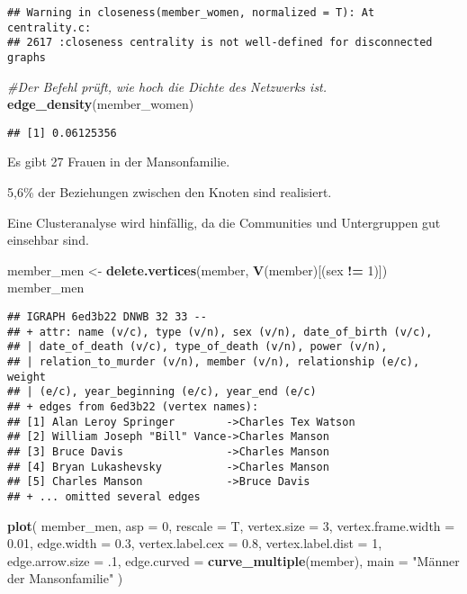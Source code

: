 \documentclass[
]{article}
\newenvironment{Shaded}{\begin{snugshade}}{\end{snugshade}}
\newcommand{\CommentTok}[1]{\textcolor[rgb]{0.56,0.35,0.01}{\textit{#1}}}
\newcommand{\DataTypeTok}[1]{\textcolor[rgb]{0.13,0.29,0.53}{#1}}
\newcommand{\DecValTok}[1]{\textcolor[rgb]{0.00,0.00,0.81}{#1}}
\newcommand{\FloatTok}[1]{\textcolor[rgb]{0.00,0.00,0.81}{#1}}
\newcommand{\KeywordTok}[1]{\textcolor[rgb]{0.13,0.29,0.53}{\textbf{#1}}}
\newcommand{\NormalTok}[1]{#1}
\newcommand{\OperatorTok}[1]{\textcolor[rgb]{0.81,0.36,0.00}{\textbf{#1}}}
\newcommand{\StringTok}[1]{\textcolor[rgb]{0.31,0.60,0.02}{#1}}
\begin{document}
\begin{verbatim}
## Warning in closeness(member_women, normalized = T): At centrality.c:
## 2617 :closeness centrality is not well-defined for disconnected graphs
\end{verbatim}

\begin{Shaded}
\begin{Highlighting}[]
\CommentTok{#Der Befehl prüft, wie hoch die Dichte des Netzwerks ist.}
\KeywordTok{edge_density}\NormalTok{(member_women)}
\end{Highlighting}
\end{Shaded}

\begin{verbatim}
## [1] 0.06125356
\end{verbatim}

Es gibt 27 Frauen in der Mansonfamilie.

5,6\% der Beziehungen zwischen den Knoten sind realisiert.

Eine Clusteranalyse wird hinfällig, da die Communities und Untergruppen
gut einsehbar sind.

\begin{Shaded}
\begin{Highlighting}[]
\NormalTok{member_men <-}\StringTok{ }\KeywordTok{delete.vertices}\NormalTok{(member, }\KeywordTok{V}\NormalTok{(member)[(sex }\OperatorTok{!=}\StringTok{ }\DecValTok{1}\NormalTok{)])}
\NormalTok{member_men}
\end{Highlighting}
\end{Shaded}

\begin{verbatim}
## IGRAPH 6ed3b22 DNWB 32 33 -- 
## + attr: name (v/c), type (v/n), sex (v/n), date_of_birth (v/c),
## | date_of_death (v/c), type_of_death (v/n), power (v/n),
## | relation_to_murder (v/n), member (v/n), relationship (e/c), weight
## | (e/c), year_beginning (e/c), year_end (e/c)
## + edges from 6ed3b22 (vertex names):
## [1] Alan Leroy Springer        ->Charles Tex Watson
## [2] William Joseph "Bill" Vance->Charles Manson    
## [3] Bruce Davis                ->Charles Manson    
## [4] Bryan Lukashevsky          ->Charles Manson    
## [5] Charles Manson             ->Bruce Davis       
## + ... omitted several edges
\end{verbatim}

\begin{Shaded}
\begin{Highlighting}[]
\KeywordTok{plot}\NormalTok{(}
\NormalTok{  member_men,}
  \DataTypeTok{asp =} \DecValTok{0}\NormalTok{,}
  \DataTypeTok{rescale =}\NormalTok{ T,}
  \DataTypeTok{vertex.size =} \DecValTok{3}\NormalTok{,}
  \DataTypeTok{vertex.frame.width =} \FloatTok{0.01}\NormalTok{,}
  \DataTypeTok{edge.width =} \FloatTok{0.3}\NormalTok{,}
  \DataTypeTok{vertex.label.cex =} \FloatTok{0.8}\NormalTok{,}
  \DataTypeTok{vertex.label.dist =} \DecValTok{1}\NormalTok{,}
  \DataTypeTok{edge.arrow.size =} \FloatTok{.1}\NormalTok{,}
  \DataTypeTok{edge.curved =} \KeywordTok{curve_multiple}\NormalTok{(member),}
  \DataTypeTok{main =} \StringTok{"Männer der Mansonfamilie"}
\NormalTok{)}
\end{Highlighting}
\end{Shaded}
\end{document}
